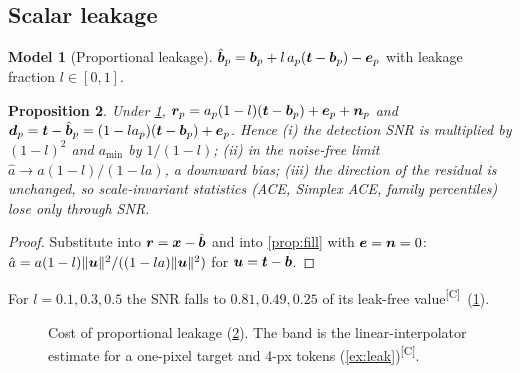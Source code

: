 \documentclass[11pt,a4paper]{article}
\theoremstyle{plain}
\newtheorem{proposition}{Proposition}[section]
\theoremstyle{definition}
\newtheorem{model}[proposition]{Model}
\theoremstyle{remark}
\newcommand{\x}{\B{x}}
\newcommand{\bvec}{\B{b}}
\newcommand{\bh}{\hat{\B{b}}}
\newcommand{\tv}{\B{t}}
\newcommand{\rv}{\B{r}}
\newcommand{\ev}{\B{e}}
\newcommand{\nv}{\B{n}}
\newcommand{\dv}{\B{d}}
\newcommand{\nrm}[1]{\lVert #1\rVert}
\newcommand{\comp}{\textsuperscript{\textsf{\scriptsize[C]}}}
\begin{document}
\subsection{Scalar leakage}

\begin{model}[Proportional leakage]
\label{mod:leak}
$\bh_p=\bvec_p+l\,a_p(\tv-\bvec_p)-\ev_p$ with leakage fraction $l\in[0,1]$.
\end{model}

\begin{proposition}
\label{prop:leak}
Under \cref{mod:leak}, $\rv_p=a_p(1-l)(\tv-\bvec_p)+\ev_p+\nv_p$ and $\dv_p=\tv-\bh_p=(1-la_p)(\tv-\bvec_p)+\ev_p$. Hence
(i) the detection SNR is multiplied by $(1-l)^2$ and $a_{\min}$ by $1/(1-l)$; (ii) in the noise-free limit
$\hat a\to a(1-l)/(1-la)$, a downward bias; (iii) the direction of the residual is unchanged, so scale-invariant
statistics (ACE, Simplex ACE, family percentiles) lose only through SNR.
\end{proposition}
\begin{proof}
Substitute into $\rv=\x-\bh$ and into \cref{prop:fill} with $\ev=\nv=0$: $\hat a=a(1-l)\nrm{\B u}^2/((1-la)\nrm{\B u}^2)$
for $\B u=\tv-\bvec$.
\end{proof}

For $l=0.1,0.3,0.5$ the SNR falls to $0.81,0.49,0.25$ of its leak-free value\comp\ (\cref{fig:leak}).

\begin{figure}[ht]
\centering
{}
\caption{Cost of proportional leakage (\cref{prop:leak}). The band is the linear-interpolator estimate for a one-pixel
target and 4-px tokens (\cref{ex:leak})\comp.}
\label{fig:leak}
\end{figure}
\end{document}
